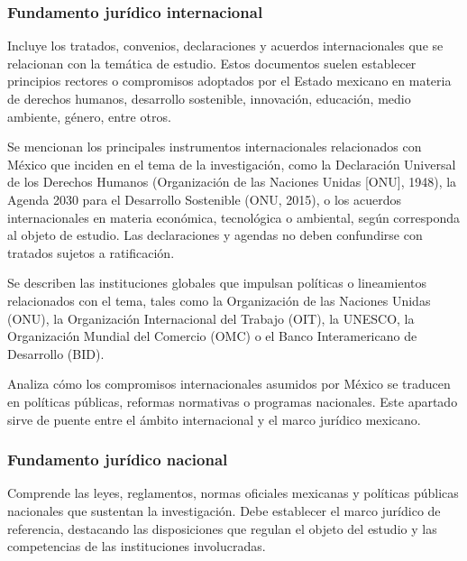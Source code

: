 \subsubsection{Fundamento jurídico internacional}

Incluye los tratados, convenios, declaraciones y acuerdos internacionales que se relacionan con la temática de estudio. Estos documentos suelen establecer principios rectores o compromisos adoptados por el Estado mexicano en materia de derechos humanos, desarrollo sostenible, innovación, educación, medio ambiente, género, entre otros.


Se mencionan los principales instrumentos internacionales relacionados con México que inciden en el tema de la investigación, como la Declaración Universal de los Derechos Humanos (Organización de las Naciones Unidas [ONU], 1948), la Agenda 2030 para el Desarrollo Sostenible (ONU, 2015), o los acuerdos internacionales en materia económica, tecnológica o ambiental, según corresponda al objeto de estudio. Las declaraciones y agendas no deben confundirse con tratados sujetos a ratificación.


Se describen las instituciones globales que impulsan políticas o lineamientos relacionados con el tema, tales como la Organización de las Naciones Unidas (ONU), la Organización Internacional del Trabajo (OIT), la UNESCO, la Organización Mundial del Comercio (OMC) o el Banco Interamericano de Desarrollo (BID).


Analiza cómo los compromisos internacionales asumidos por México se traducen en políticas públicas, reformas normativas o programas nacionales. Este apartado sirve de puente entre el ámbito internacional y el marco jurídico mexicano.

\subsubsection{Fundamento jurídico nacional}

Comprende las leyes, reglamentos, normas oficiales mexicanas y políticas públicas nacionales que sustentan la investigación. Debe establecer el marco jurídico de referencia, destacando las disposiciones que regulan el objeto del estudio y las competencias de las instituciones involucradas.

